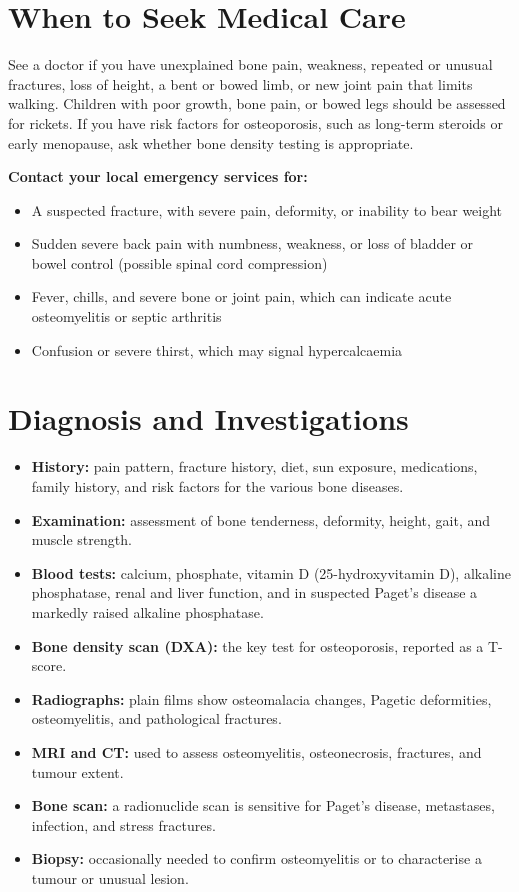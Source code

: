 \section*{When to Seek Medical Care}
See a doctor if you have unexplained bone pain, weakness, repeated or unusual fractures, loss of height, a bent or bowed limb, or new joint pain that limits walking. Children with poor growth, bone pain, or bowed legs should be assessed for rickets. If you have risk factors for osteoporosis, such as long-term steroids or early menopause, ask whether bone density testing is appropriate.

\textbf{Contact your local emergency services for:}
\begin{itemize}
    \item A suspected fracture, with severe pain, deformity, or inability to bear weight
    \item Sudden severe back pain with numbness, weakness, or loss of bladder or bowel control (possible spinal cord compression)
    \item Fever, chills, and severe bone or joint pain, which can indicate acute osteomyelitis or septic arthritis
    \item Confusion or severe thirst, which may signal hypercalcaemia
\end{itemize}

\section*{Diagnosis and Investigations}
\begin{itemize}
    \item \textbf{History:} pain pattern, fracture history, diet, sun exposure, medications, family history, and risk factors for the various bone diseases.
    \item \textbf{Examination:} assessment of bone tenderness, deformity, height, gait, and muscle strength.
    \item \textbf{Blood tests:} calcium, phosphate, vitamin D (25-hydroxyvitamin D), alkaline phosphatase, renal and liver function, and in suspected Paget's disease a markedly raised alkaline phosphatase.
    \item \textbf{Bone density scan (DXA):} the key test for osteoporosis, reported as a T-score.
    \item \textbf{Radiographs:} plain films show osteomalacia changes, Pagetic deformities, osteomyelitis, and pathological fractures.
    \item \textbf{MRI and CT:} used to assess osteomyelitis, osteonecrosis, fractures, and tumour extent.
    \item \textbf{Bone scan:} a radionuclide scan is sensitive for Paget's disease, metastases, infection, and stress fractures.
    \item \textbf{Biopsy:} occasionally needed to confirm osteomyelitis or to characterise a tumour or unusual lesion.
\end{itemize}

